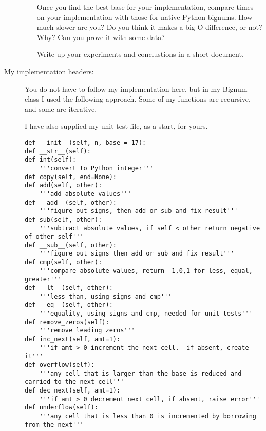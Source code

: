 \documentclass{article}
\begin{document}
\begin{description}
\begin{itemize}
Once you find the best base for your implementation, compare
times on your implementation with those for native Python bignums.
How much slower are you?  Do you think it makes a big-O difference,
or not?  Why?  Can you prove it with some data?

Write up your experiments and conclustions in a short document.

    
\end{itemize}

\newpage
\item[My implementation headers:]   
You do not have to follow my implementation here, 
but in my Bignum class 
I used the following approach.  Some of my functions are recursive,
and some are iterative.

I have also supplied my unit test file, as a start, for yours.

\begin{lstlisting}
def __init__(self, n, base = 17):
def __str__(self):
def int(self):
    '''convert to Python integer'''
def copy(self, end=None):
def add(self, other):
    '''add absolute values'''
def __add__(self, other):
    '''figure out signs, then add or sub and fix result'''
def sub(self, other):
    '''subtract absolute values, if self < other return negative of other-self'''
def __sub__(self, other):
    '''figure out signs then add or sub and fix result'''
def cmp(self, other):
    '''compare absolute values, return -1,0,1 for less, equal, greater'''        
def __lt__(self, other):
    '''less than, using signs and cmp'''
def __eq__(self, other):
    '''equality, using signs and cmp, needed for unit tests'''
def remove_zeros(self):
    '''remove leading zeros'''               
def inc_next(self, amt=1):
    '''if amt > 0 increment the next cell.  if absent, create it'''
def overflow(self):
    '''any cell that is larger than the base is reduced and carried to the next cell''' 
def dec_next(self, amt=1):
    '''if amt > 0 decrement next cell, if absent, raise error'''            
def underflow(self):
    '''any cell that is less than 0 is incremented by borrowing from the next'''
\end{lstlisting}
\end{description}
\end{document}
